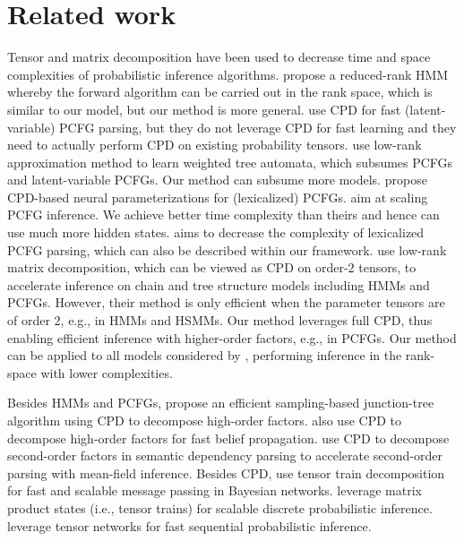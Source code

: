 \documentclass[11pt]{article}
\begin{document}
\section{Related work}
Tensor and matrix decomposition have been used to decrease time and space complexities of probabilistic inference algorithms.  \citet{DBLP:journals/jmlr/SiddiqiBG10} propose a reduced-rank HMM whereby the forward algorithm can be carried out in the rank space, which is similar to our model, but our method is more general.
\citet{DBLP:conf/nips/CohenC12, cohen-etal-2013-approximate} use CPD for fast (latent-variable) PCFG parsing, but they do not leverage CPD for fast learning and they need to actually perform CPD on existing probability tensors. \citet{DBLP:conf/aistats/RabusseauBC16} use low-rank approximation method to learn weighted tree automata, which subsumes PCFGs and latent-variable PCFGs. Our method can subsume more models.
\citet{yang-etal-2021-pcfgs, yang-etal-2021-neural} propose CPD-based neural parameterizations for (lexicalized) PCFGs. \citet{yang-etal-2021-pcfgs} aim at scaling PCFG inference. We achieve better time complexity than theirs and hence can use much more hidden states. \citet{yang-etal-2021-neural} aims to decrease the complexity of lexicalized PCFG parsing, which can also be described within our framework. 
\citet{chiu2021low} use low-rank matrix decomposition, which can be viewed as CPD on order-2 tensors, to accelerate inference on chain and tree structure models including HMMs and PCFGs. However, their method is only efficient when the parameter tensors are of order 2, e.g., in HMMs and HSMMs. Our method leverages full CPD, thus enabling efficient inference with higher-order factors, e.g., in PCFGs. Our method can be applied to all models considered by \citet{chiu2021low}, performing inference in the rank-space with lower complexities. 

Besides HMMs and PCFGs,  \citet{DBLP:conf/icml/WrigleyLY17} propose an efficient sampling-based junction-tree algorithm using CPD to decompose high-order factors. \citet{DBLP:journals/corr/abs-2010-09283} also use CPD to decompose high-order factors for fast belief propagation. \citet{yang2022modeling} use CPD to decompose second-order factors in semantic dependency parsing to  accelerate second-order parsing with mean-field inference. Besides CPD, 
\citet{DBLP:conf/pgm/DucampBNW20} use tensor train decomposition for fast and scalable message passing in Bayesian networks. \citet{JMLR:v22:18-431} leverage matrix product states (i.e., tensor trains) for scalable discrete probabilistic inference. \citet{DBLP:conf/aistats/MillerRT21} leverage tensor networks for fast sequential probabilistic inference.
\end{document}
